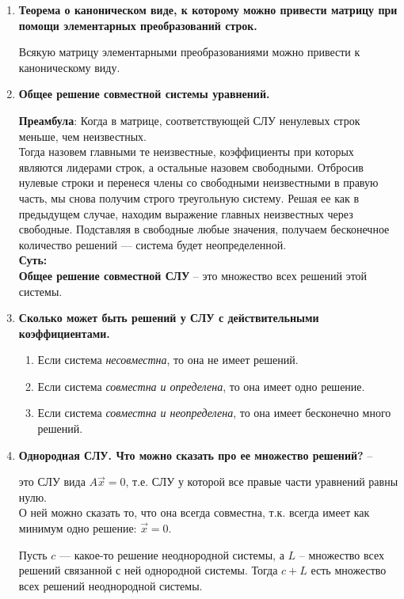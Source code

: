 \begin{enumerate}
\item \textbf{Теорема о каноническом виде, к которому можно привести матрицу при помощи элементарных преобразований строк.}
\begin{Theorem}
	Всякую матрицу элементарными преобразованиями можно привести к каноническому виду.
\end{Theorem}

\item \textbf{Общее решение совместной системы уравнений.}

\textbf{Преамбула}:
Когда в матрице, соответствующей СЛУ ненулевых строк меньше, чем неизвестных. \\
Тогда назовем главными те неизвестные, коэффициенты при которых являются лидерами строк, а остальные назовем свободными. Отбросив нулевые строки и перенеся члены со свободными неизвестными в правую часть, мы снова получим строго треугольную систему. Решая ее как в предыдущем случае, находим выражение главных неизвестных через свободные. Подставляя в свободные любые значения, получаем бесконечное количество решений — система будет неопределенной.\\
\textbf{Суть:}\\
\textbf{Общее решение совместной СЛУ} -- это множество всех решений этой системы. 

\item \textbf{Сколько может быть решений у СЛУ с действительными коэффициентами.}
\begin{enumerate}
	\item Если система \textit{несовместна}, то она не имеет решений.
	\item Если система \textit{совместна и определена}, то она имеет одно решение.
	\item Если система \textit{совместна и неопределена}, то она имеет бесконечно много решений.
\end{enumerate}

\item \textbf{Однородная СЛУ. Что можно сказать про ее множество решений?} --

это СЛУ вида $A\vec{x} = 0$, т.е. СЛУ у которой все правые части уравнений равны нулю. \\
О ней можно сказать то, что она всегда совместна, т.к. всегда имеет как минимум одно решение: $\vec{x} = 0$.

\begin{Theorem}
	Пусть $c$ — какое-то решение неоднородной системы, а $L$ -- множество всех решений связанной с ней однородной системы. Тогда $c+L$ есть множество всех решений неоднородной системы.
\end{Theorem}


\end{enumerate}
